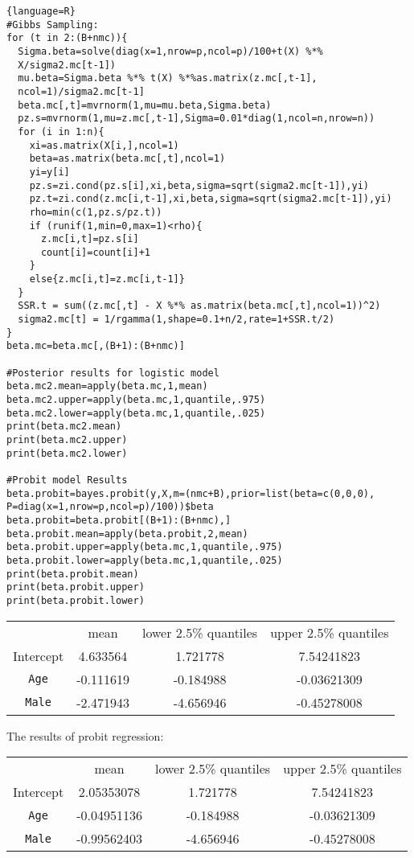 \documentclass[12pt]{article}
\newenvironment{problem}[2][Problem]{\begin{trivlist}
\item[\hskip \labelsep {\bfseries #1}\hskip \labelsep {\bfseries #2.}]}{\end{trivlist}}
\begin{document}
\begin{problem}{4}
\begin{lstlisting}{language=R}
#Gibbs Sampling:
for (t in 2:(B+nmc)){
  Sigma.beta=solve(diag(x=1,nrow=p,ncol=p)/100+t(X) %*% 
  X/sigma2.mc[t-1])
  mu.beta=Sigma.beta %*% t(X) %*%as.matrix(z.mc[,t-1], 
  ncol=1)/sigma2.mc[t-1]
  beta.mc[,t]=mvrnorm(1,mu=mu.beta,Sigma.beta)
  pz.s=mvrnorm(1,mu=z.mc[,t-1],Sigma=0.01*diag(1,ncol=n,nrow=n))
  for (i in 1:n){
    xi=as.matrix(X[i,],ncol=1)
    beta=as.matrix(beta.mc[,t],ncol=1)
    yi=y[i]
    pz.s=zi.cond(pz.s[i],xi,beta,sigma=sqrt(sigma2.mc[t-1]),yi)
    pz.t=zi.cond(z.mc[i,t-1],xi,beta,sigma=sqrt(sigma2.mc[t-1]),yi)
    rho=min(c(1,pz.s/pz.t))
    if (runif(1,min=0,max=1)<rho){
      z.mc[i,t]=pz.s[i]
      count[i]=count[i]+1
    }
    else{z.mc[i,t]=z.mc[i,t-1]}
  }
  SSR.t = sum((z.mc[,t] - X %*% as.matrix(beta.mc[,t],ncol=1))^2)
  sigma2.mc[t] = 1/rgamma(1,shape=0.1+n/2,rate=1+SSR.t/2)
}
beta.mc=beta.mc[,(B+1):(B+nmc)]

#Posterior results for logistic model
beta.mc2.mean=apply(beta.mc,1,mean)
beta.mc2.upper=apply(beta.mc,1,quantile,.975)
beta.mc2.lower=apply(beta.mc,1,quantile,.025)
print(beta.mc2.mean)
print(beta.mc2.upper)
print(beta.mc2.lower)

#Probit model Results
beta.probit=bayes.probit(y,X,m=(nmc+B),prior=list(beta=c(0,0,0), 
P=diag(x=1,nrow=p,ncol=p)/100))$beta
beta.probit=beta.probit[(B+1):(B+nmc),]
beta.probit.mean=apply(beta.probit,2,mean)
beta.probit.upper=apply(beta.mc,1,quantile,.975)
beta.probit.lower=apply(beta.mc,1,quantile,.025)
print(beta.probit.mean)
print(beta.probit.upper)
print(beta.probit.lower)
\end{lstlisting}
 
 \begin{center}
  \begin{tabular}{ |c|c|c|c| }
  \hline
  ~\ & mean & lower 2.5\% quantiles & upper 2.5\% quantiles  \\ 
  Intercept & 4.633564 & 1.721778 & 7.54241823  \\ 
  \texttt{Age} & -0.111619 & -0.184988 & -0.03621309  \\
  \texttt{Male} & -2.471943 & -4.656946 & -0.45278008  \\
  \hline
  \end{tabular}
 \end{center}
 
The results of probit regression:\\ 
 \begin{center}
  \begin{tabular}{ |c|c|c|c| }
  \hline
  ~\ & mean & lower 2.5\% quantiles & upper 2.5\% quantiles  \\ 
  Intercept &  2.05353078 & 1.721778 & 7.54241823  \\ 
  \texttt{Age} & -0.04951136 & -0.184988 & -0.03621309  \\
  \texttt{Male} & -0.99562403 & -4.656946 & -0.45278008  \\
  \hline
  \end{tabular}
 \end{center}
 

\end{problem}
\end{document}
